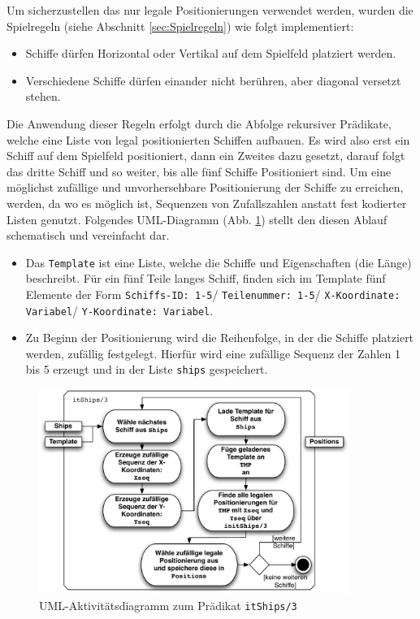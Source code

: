 	Um sicherzustellen das nur legale Positionierungen verwendet werden, wurden die Spielregeln (siehe Abschnitt \ref{sec:Spielregeln}) wie folgt implementiert:
	\begin{itemize}
		\item Schiffe dürfen Horizontal oder Vertikal auf dem Spielfeld platziert werden.\newline
		
		\item Verschiedene Schiffe dürfen einander nicht berühren, aber diagonal versetzt stehen.
		
	\end{itemize}
	Die Anwendung dieser Regeln erfolgt durch die Abfolge rekursiver Prädikate, welche eine Liste von legal positionierten Schiffen aufbauen. Es wird also 
	erst ein Schiff auf dem Spielfeld positioniert, dann ein Zweites dazu gesetzt, darauf folgt das dritte Schiff und so weiter, bis alle fünf Schiffe Positioniert 
	sind. Um eine möglichst zufällige und unvorhersehbare Positionierung der Schiffe zu erreichen, werden, da wo es möglich ist, Sequenzen von Zufallszahlen anstatt 
	fest kodierter Listen genutzt. Folgendes UML-Diagramm (Abb. \ref{fig:itShips}) stellt den diesen Ablauf schematisch und vereinfacht dar.
	\begin{itemize}
		\item Das \texttt{Template} ist eine Liste, welche die Schiffe und Eigenschaften (die Länge) beschreibt. Für ein fünf Teile langes Schiff, finden sich im 
		Template fünf Elemente der Form \texttt{Schiffs-ID: 1-5}/ \texttt{Teilenummer: 1-5}/ \texttt{X-Koordinate: Variabel}/ \texttt{Y-Koordinate: Variabel}.
		\item Zu Beginn der Positionierung wird die Reihenfolge, in der die Schiffe platziert werden, zufällig festgelegt. Hierfür wird eine zufällige Sequenz der 
		Zahlen 1 bis 5 erzeugt und in der Liste \texttt{ships} gespeichert.
	\end{itemize}
	\begin{figure}[H] %
		\centering
		\includegraphics[width=0.9\textwidth]{images/itShips3.pdf}
		\caption{UML-Aktivitätsdiagramm zum Prädikat \texttt{itShips/3}}
		\label{fig:itShips}
	\end{figure}
